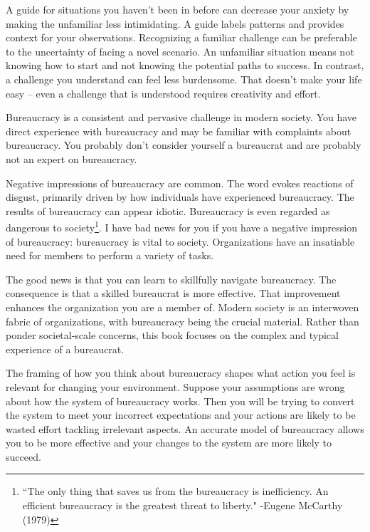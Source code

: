 
A guide for situations you haven't been in before can decrease your anxiety by making the unfamiliar less intimidating. 
A guide labels patterns and provides context for your observations. 
Recognizing a familiar challenge can be preferable to the uncertainty of facing a novel scenario. An unfamiliar situation means not knowing how to start and not knowing the potential paths to success. In contrast, a challenge you understand can feel less burdensome. That doesn't make your life easy -- even a challenge that is understood requires creativity and effort.

Bureaucracy is a consistent and pervasive challenge in modern society. You have direct experience with bureaucracy and may be familiar with complaints about bureaucracy. You probably don't consider yourself a bureaucrat and are probably not an expert on bureaucracy.


Negative impressions of bureaucracy are common. The word
evokes reactions of disgust, primarily driven by how individuals have experienced bureaucracy.
The results of bureaucracy can appear idiotic.
Bureaucracy is even regarded as dangerous to society\footnote{``The only thing that saves us from the bureaucracy is inefficiency. An efficient bureaucracy is the greatest threat to liberty." -Eugene McCarthy (1979)}.
I have bad news for you if you have a negative impression of bureaucracy: bureaucracy is vital to society. 
Organizations have an insatiable need for members to perform a variety of tasks.

The good news is that you can learn to skillfully navigate bureaucracy. The consequence is that a skilled bureaucrat is more effective. That improvement enhances the organization you are a member of. Modern society is an interwoven fabric of organizations, with  bureaucracy being the crucial material.
Rather than ponder societal-scale concerns, this book focuses on the complex and typical experience of a bureaucrat. 


The framing of how you think about bureaucracy shapes what action you feel is relevant for changing your environment. 
Suppose your assumptions are wrong about how the system of bureaucracy works. Then you will be trying to convert the system to meet your incorrect expectations and your actions are likely to be wasted effort tackling irrelevant aspects. 
An accurate model of bureaucracy allows you to be more effective and your changes to the system are more likely to succeed. 

